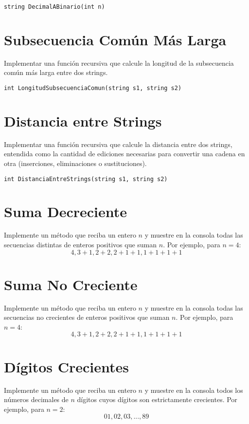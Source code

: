 \begin{verbatim}
string DecimalABinario(int n)
\end{verbatim}

\section{Subsecuencia Común Más Larga}
Implementar una función recursiva que calcule la longitud de la subsecuencia común más larga entre dos strings.

\begin{verbatim}
int LongitudSubsecuenciaComun(string s1, string s2)
\end{verbatim}

\section{Distancia entre Strings}
Implementar una función recursiva que calcule la distancia entre dos strings, entendida como la cantidad de ediciones necesarias para convertir una cadena en otra (inserciones, eliminaciones o sustituciones).

\begin{verbatim}
int DistanciaEntreStrings(string s1, string s2)
\end{verbatim}

\section{Suma Decreciente}
Implemente un método que reciba un entero \( n \) y muestre en la consola todas las secuencias distintas de enteros positivos que suman \( n \). Por ejemplo, para \( n = 4 \):
\[
4, 3+1, 2+2, 2+1+1, 1+1+1+1
\]

\section{Suma No Creciente}
Implemente un método que reciba un entero \( n \) y muestre en la consola todas las secuencias no crecientes de enteros positivos que suman \( n \). Por ejemplo, para \( n = 4 \):
\[
4, 3+1, 2+2, 2+1+1, 1+1+1+1
\]

\section{Dígitos Crecientes}
Implemente un método que reciba un entero \( n \) y muestre en la consola todos los números decimales de \( n \) dígitos cuyos dígitos son estrictamente crecientes. Por ejemplo, para \( n = 2 \):
\[
01, 02, 03, ..., 89
\]
        
